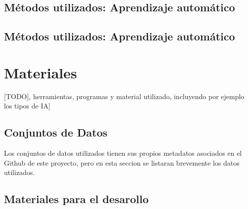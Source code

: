 \subsection{Métodos utilizados: Aprendizaje automático} \label{sec:Metodos_ML}



\subsection{Métodos utilizados: Aprendizaje automático} \label{sec:Metodos_cloud}


\newpage



\section{Materiales}



[TODO], herramientas, programas y material utilizado, incluyendo por ejemplo los tipos de IA]

\subsection{Conjuntos de Datos} \label{sec:Materiales_datos}

Los conjuntos de datos utilizados tienen sus propios metadatos asociados en el Github de este proyecto, pero en esta seccion se listaran brevemente los datos utilizados.





\newpage



\subsection{Materiales para el desarollo} 

